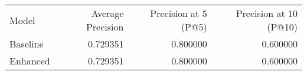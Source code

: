 \begin{tabular}{lrrr}
Model & Average Precision & Precision at 5 (P@5) & Precision at 10 (P@10) \\
Baseline & 0.729351 & 0.800000 & 0.600000 \\
Enhanced & 0.729351 & 0.800000 & 0.600000 \\
\end{tabular}
